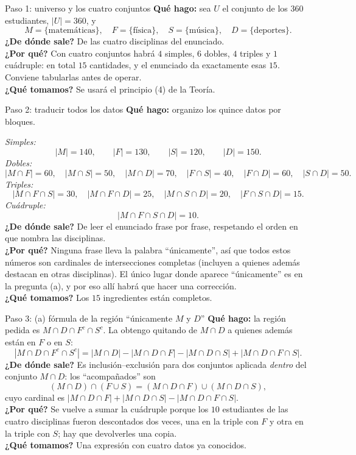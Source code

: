 \documentclass[11pt]{article}
\begin{document}
\begin{sol}

\begin{paso}{Paso 1: universo y los cuatro conjuntos}
\textbf{Qu\'e hago:} sea $U$ el conjunto de los $360$ estudiantes, $|U|=360$, y
\[
M=\{\text{matem\'aticas}\},\quad F=\{\text{f\'isica}\},\quad S=\{\text{m\'usica}\},\quad D=\{\text{deportes}\}.
\]
\textbf{¿De d\'onde sale?} De las cuatro disciplinas del enunciado.\\
\textbf{¿Por qu\'e?} Con cuatro conjuntos habr\'a $4$ simples, $6$ dobles, $4$ triples y $1$ cu\'adruple: en total $15$ cantidades, y el enunciado da exactamente esas $15$. Conviene tabularlas antes de operar.\\
\textbf{¿Qu\'e tomamos?} Se usar\'a el principio (4) de la Teor\'ia.
\end{paso}

\begin{paso}{Paso 2: traducir todos los datos}
\textbf{Qu\'e hago:} organizo los quince datos por bloques.

\emph{Simples:}
\[
|M| = 140,\qquad |F| = 130,\qquad |S| = 120,\qquad |D| = 150 .
\]
\emph{Dobles:}
\[
|M\cap F| = 60,\quad |M\cap S| = 50,\quad |M\cap D| = 70,\quad |F\cap S| = 40,\quad |F\cap D| = 60,\quad |S\cap D| = 50 .
\]
\emph{Triples:}
\[
|M\cap F\cap S| = 30,\quad |M\cap F\cap D| = 25,\quad |M\cap S\cap D| = 20,\quad |F\cap S\cap D| = 15 .
\]
\emph{Cu\'adruple:}
\[
|M\cap F\cap S\cap D| = 10 .
\]
\textbf{¿De d\'onde sale?} De leer el enunciado frase por frase, respetando el orden en que nombra las disciplinas.\\
\textbf{¿Por qu\'e?} Ninguna frase lleva la palabra ``\'unicamente'', as\'i que todos estos n\'umeros son cardinales de intersecciones completas (incluyen a quienes adem\'as destacan en otras disciplinas). El \'unico lugar donde aparece ``\'unicamente'' es en la pregunta (a), y por eso all\'i habr\'a que hacer una correcci\'on.\\
\textbf{¿Qu\'e tomamos?} Los $15$ ingredientes est\'an completos.
\end{paso}

\begin{paso}{Paso 3: (a) f\'ormula de la regi\'on ``\'unicamente $M$ y $D$''}
\textbf{Qu\'e hago:} la regi\'on pedida es $M\cap D\cap F^{c}\cap S^{c}$. La obtengo quitando de $M\cap D$ a quienes adem\'as est\'an en $F$ o en $S$:
\[
|M\cap D\cap F^{c}\cap S^{c}| = |M\cap D| - |M\cap D\cap F| - |M\cap D\cap S| + |M\cap D\cap F\cap S| .
\]
\textbf{¿De d\'onde sale?} Es inclusi\'on--exclusi\'on para dos conjuntos aplicada \emph{dentro} del conjunto $M\cap D$: los ``acompa\~nados'' son
\[
(M\cap D)\cap(F\cup S) = (M\cap D\cap F)\cup(M\cap D\cap S),
\]
cuyo cardinal es $|M\cap D\cap F| + |M\cap D\cap S| - |M\cap D\cap F\cap S|$.\\
\textbf{¿Por qu\'e?} Se vuelve a sumar la cu\'adruple porque los $10$ estudiantes de las cuatro disciplinas fueron descontados dos veces, una en la triple con $F$ y otra en la triple con $S$; hay que devolverles una copia.\\
\textbf{¿Qu\'e tomamos?} Una expresi\'on con cuatro datos ya conocidos.
\end{paso}


\end{sol}
\end{document}
